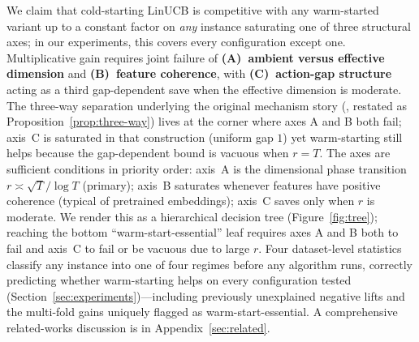 \documentclass{article}
\theoremstyle{definition}
\theoremstyle{remark}
\theoremstyle{remark}
\begin{document}
We claim that cold-starting LinUCB is competitive with any warm-started
variant up to a constant factor on \emph{any} instance saturating one of
three structural axes; in our experiments, this covers every configuration
except one. Multiplicative gain requires joint failure of
\textbf{(A)~ambient versus effective dimension} and \textbf{(B)~feature
coherence}, with \textbf{(C)~action-gap structure} acting as a third
gap-dependent save when the effective dimension is moderate. The three-way
separation underlying the original mechanism story
(\cite{chen2024llmdecision}, restated as Proposition~\ref{prop:three-way})
lives at the corner where axes A and B both fail; axis~C is saturated in that
construction (uniform gap $1$) yet warm-starting still helps because the
gap-dependent bound is vacuous when $r=T$. The axes are sufficient conditions
in priority order: axis~A is the dimensional phase transition
$r\!\asymp\!\sqrt T/\log T$ (primary); axis~B saturates whenever features
have positive coherence (typical of pretrained embeddings); axis~C saves
only when $r$ is moderate. We render this as a hierarchical decision tree
(Figure~\ref{fig:tree}); reaching the bottom ``warm-start-essential'' leaf
requires axes A and B both to fail and axis~C to fail or be vacuous due to
large $r$. Four dataset-level statistics classify any instance into one of
four regimes before any algorithm runs, correctly predicting whether
warm-starting helps on every configuration tested
(Section~\ref{sec:experiments})---including previously unexplained negative
lifts and the multi-fold gains uniquely flagged as warm-start-essential. A
comprehensive related-works discussion is in Appendix~\ref{sec:related}.
\end{document}

